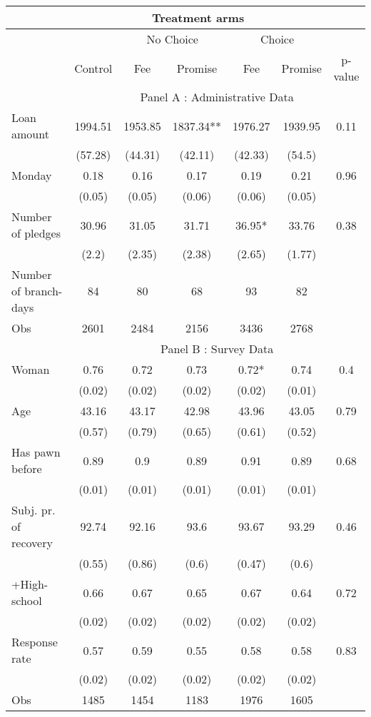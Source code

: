 \begin{tabular}{lcccccc}
\toprule
      & \multicolumn{5}{c}{Treatment arms}    &  \\
\midrule
      &       & \multicolumn{2}{c}{No Choice } & \multicolumn{2}{c}{Choice} &  \\
\midrule
\midrule
      & Control & Fee   & Promise & Fee   & Promise & p-value \\
\midrule
      & \multicolumn{6}{c}{Panel A : Administrative Data} \\
\midrule
\midrule
Loan amount  & 1994.51 & 1953.85 & 1837.34** & 1976.27 & 1939.95 & 0.11 \\
      & (57.28) & (44.31) & (42.11) & (42.33) & (54.5) &  \\
Monday & 0.18  & 0.16  & 0.17  & 0.19  & 0.21  & 0.96 \\
      & (0.05) & (0.05) & (0.06) & (0.06) & (0.05) &  \\
Number of pledges & 30.96 & 31.05 & 31.71 & 36.95* & 33.76 & 0.38 \\
      & (2.2) & (2.35) & (2.38) & (2.65) & (1.77) &  \\
\midrule
Number of branch-days & 84    & 80    & 68    & 93    & 82    &  \\
Obs   & 2601  & 2484  & 2156  & 3436  & 2768  &  \\
\midrule
      & \multicolumn{6}{c}{Panel B : Survey Data} \\
\midrule
\midrule
Woman & 0.76  & 0.72  & 0.73  & 0.72* & 0.74  & 0.4 \\
      & (0.02) & (0.02) & (0.02) & (0.02) & (0.01) &  \\
Age   & 43.16 & 43.17 & 42.98 & 43.96 & 43.05 & 0.79 \\
      & (0.57) & (0.79) & (0.65) & (0.61) & (0.52) &  \\
Has pawn before & 0.89  & 0.9   & 0.89  & 0.91  & 0.89  & 0.68 \\
      & (0.01) & (0.01) & (0.01) & (0.01) & (0.01) &  \\
Subj. pr. of recovery & 92.74 & 92.16 & 93.6  & 93.67 & 93.29 & 0.46 \\
      & (0.55) & (0.86) & (0.6) & (0.47) & (0.6) &  \\
+High-school & 0.66  & 0.67  & 0.65  & 0.67  & 0.64  & 0.72 \\
      & (0.02) & (0.02) & (0.02) & (0.02) & (0.02) &  \\
Response rate & 0.57  & 0.59  & 0.55  & 0.58  & 0.58  & 0.83 \\
      & (0.02) & (0.02) & (0.02) & (0.02) & (0.02) &  \\
\midrule
Obs   & 1485  & 1454  & 1183  & 1976  & 1605  &  \\
\bottomrule
\bottomrule
\end{tabular}%

